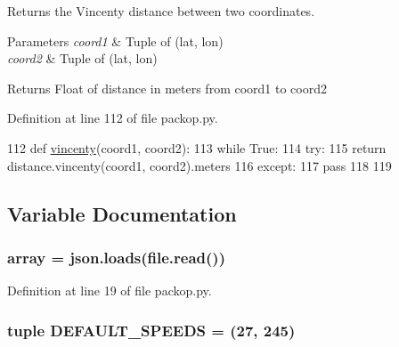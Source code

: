 Returns the Vincenty distance between two coordinates. 


\begin{DoxyParams}{Parameters}
{\em coord1} & Tuple of (lat, lon) \\
\hline
{\em coord2} & Tuple of (lat, lon)\\
\hline
\end{DoxyParams}
\begin{DoxyReturn}{Returns}
Float of distance in meters from coord1 to coord2 
\end{DoxyReturn}


Definition at line 112 of file packop.\+py.


\begin{DoxyCode}
112 \textcolor{keyword}{def }\hyperlink{namespacesrc_1_1packop_ac16b65508182630b4ab800bffc0d06f0}{vincenty}(coord1, coord2):
113     \textcolor{keywordflow}{while} \textcolor{keyword}{True}:
114         \textcolor{keywordflow}{try}:
115             \textcolor{keywordflow}{return} distance.vincenty(coord1, coord2).meters
116         \textcolor{keywordflow}{except}:
117             \textcolor{keywordflow}{pass}
118 
119 
\end{DoxyCode}


\subsection{Variable Documentation}
\subsubsection[{\texorpdfstring{array}{array}}]{\setlength{\rightskip}{0pt plus 5cm}array = json.\+loads(file.\+read())}\hypertarget{namespacesrc_1_1packop_a41ab4b8b4e6b05e8489555b1bbc7f845}{}\label{namespacesrc_1_1packop_a41ab4b8b4e6b05e8489555b1bbc7f845}


Definition at line 19 of file packop.\+py.

\subsubsection[{\texorpdfstring{D\+E\+F\+A\+U\+L\+T\+\_\+\+S\+P\+E\+E\+DS}{DEFAULT_SPEEDS}}]{\setlength{\rightskip}{0pt plus 5cm}tuple D\+E\+F\+A\+U\+L\+T\+\_\+\+S\+P\+E\+E\+DS = (27, 245)}\hypertarget{namespacesrc_1_1packop_a21bd10200165ff80dfb55057200f8532}{}\label{namespacesrc_1_1packop_a21bd10200165ff80dfb55057200f8532}


